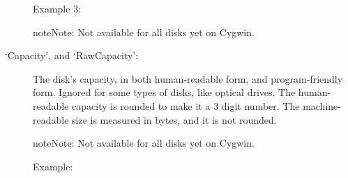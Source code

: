 \documentclass[letterpaper,10pt,english]{sphinxmanual}
\begin{document}
\begin{description}
\begin{description}
\item[{Example 3:}] \leavevmode
\begin{sphinxVerbatim}[commandchars=\\\{\}]
\PYG{p}{[}\PYG{p}{]}\PYG{p}{[}\PYG{p}{]}
\end{sphinxVerbatim}

\end{description}

\begin{sphinxadmonition}{note}{Note:}
Not available for all disks yet on Cygwin.
\end{sphinxadmonition}

\item[{‘Capacity’, and ‘RawCapacity’:}] \leavevmode
The disk’s capacity, in both human-readable form, and program-friendly form.
Ignored for some types of disks, like optical drives. The human-readable
capacity is rounded to make it a 3 digit number. The machine-readable size is
measured in bytes, and it is not rounded.

\begin{sphinxadmonition}{note}{Note:}
Not available for all disks yet on Cygwin.
\end{sphinxadmonition}
\begin{description}
\item[{Example:}] \leavevmode
\begin{sphinxVerbatim}[commandchars=\\\{\}]
\PYG{p}{[}\PYG{p}{]}\PYG{p}{[}\PYG{p}{]}
\end{sphinxVerbatim}

\begin{sphinxVerbatim}[commandchars=\\\{\}]
\PYG{p}{[}\PYG{p}{]}\PYG{p}{[}\PYG{p}{]}
\end{sphinxVerbatim}


\end{description}
\end{description}
\end{document}
